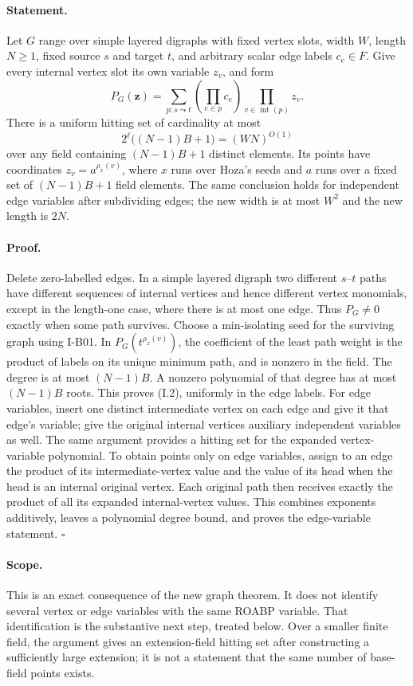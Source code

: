 \documentclass[11pt,a4paper]{article}
\theoremstyle{definition}\newtheorem{definition}{Definition}
\begin{document}
\paragraph{Statement.}
Let $G$ range over simple layered digraphs with fixed vertex slots,
width $W$, length $N\ge1$, fixed source $s$ and target $t$, and arbitrary
scalar edge labels $c_e\in F$.  Give every internal vertex slot its own
variable $z_v$, and form
\[
 P_G(\mathbf z)=\sum_{p:s\leadsto t}\left(\prod_{e\in p}c_e\right)
                        \prod_{v\in\operatorname{int}(p)}z_v.
\]
There is a uniform hitting set of cardinality at most
\[
 2^{\ell}\bigl((N-1)B+1\bigr)=(WN)^{O(1)}
\tag{I.2}
\]
over any field containing $(N-1)B+1$ distinct elements.  Its points have
coordinates $z_v=a^{\rho_x(v)}$, where $x$ runs over Hoza's seeds and
$a$ runs over a fixed set of $(N-1)B+1$ field elements.  The same conclusion
holds for independent edge variables after subdividing edges; the new
width is at most $W^2$ and the new length is $2N$.

\paragraph{Proof.}
Delete zero-labelled edges.  In a simple layered digraph two different
$s$--$t$ paths have different sequences of internal vertices and hence
different vertex monomials, except in the length-one case, where there
is at most one edge.  Thus $P_G\ne0$ exactly when some path survives.
Choose a min-isolating seed for the surviving graph using I-B01.  In
$P_G(t^{\rho_x(v)})$, the coefficient of the least path weight is the
product of labels on its unique minimum path, and is nonzero in the
field.  The degree is at most $(N-1)B$.  A nonzero polynomial of that
degree has at most $(N-1)B$ roots.  This proves (I.2), uniformly in the
edge labels.  For edge variables, insert one distinct intermediate
vertex on each edge and give it that edge's variable; give the original
internal vertices auxiliary independent variables as well.  The same
argument provides a hitting set for the expanded vertex-variable
polynomial.  To obtain points only on edge variables, assign to an edge
the product of its intermediate-vertex value and the value of its head
when the head is an internal original vertex.  Each original path then
receives exactly the product of all its expanded internal-vertex values.
This combines exponents additively, leaves a polynomial degree bound,
and proves the edge-variable statement. \hfill$\square$

\paragraph{Scope.}
This is an exact consequence of the new graph theorem.  It does not
identify several vertex or edge variables with the same ROABP variable.
That identification is the substantive next step, treated below.
Over a smaller finite field, the argument gives an extension-field
hitting set after constructing a sufficiently large extension; it is
not a statement that the same number of base-field points exists.
\end{document}
